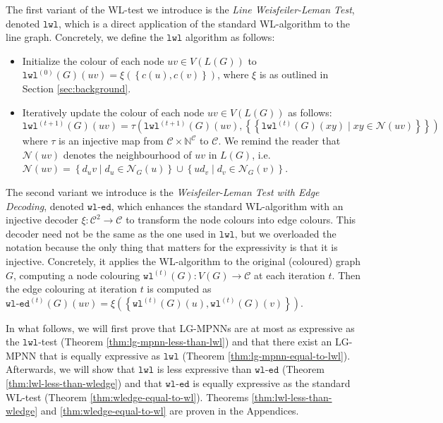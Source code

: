 \documentclass{article}
\newcommand{\set}[1]{\left\{#1\right\}}
\newcommand{\multiset}[1]{\left\{\!\!\left\{#1\right\}\!\!\right\}}
\newcommand{\iter}[1]{^{(#1)}}
\newcommand{\wl}{\texttt{wl}}
\newcommand{\wledge}{\texttt{wl-ed}}
\newcommand{\lwl}{\texttt{lwl}}
\newcommand{\dec}{\xi}
\newcommand{\hash}{\tau}
\newcommand{\nbh}{\mathcal{N}}
\newcommand{\mcc}{\mathcal{C}}
\newcommand{\mbn}{\mathbb{N}}
\begin{document}
The first variant of the WL-test we introduce is the \emph{Line Weisfeiler-Leman Test}, denoted $\lwl$, which is a direct application of the standard WL-algorithm to the line graph. Concretely, we define the $\lwl$ algorithm as follows:
\begin{itemize}
    \item Initialize the colour of each node $uv \in V(L(G))$ to $\lwl\iter{0}(G)(uv) = \dec(\set{c(u),c(v)})$, where $\dec$ is as outlined in Section \ref{sec:background}.
    \item Iteratively update the colour of each node $uv \in V(L(G))$ as follows:
    \begin{equation}
        \lwl\iter{t+1}(G)(uv) = \hash\left(\lwl\iter{t+1}(G)(uv), \multiset{\lwl\iter{t}(G)(xy) \mid xy \in \nbh(uv)}\right)
    \end{equation}
    where $\hash$ is an injective map from $\mcc\times\mbn^\mcc$ to $\mcc$. We remind the reader that $\nbh(uv)$ denotes the neighbourhood of $uv$ in $L(G)$, i.e. $\nbh(uv) = \set{d_uv \mid d_u \in \nbh_G(u)} \cup \set{ud_v \mid d_v \in \nbh_G(v)}$.
\end{itemize}
The second variant we introduce is the \emph{Weisfeiler-Leman Test with Edge Decoding}, denoted $\wledge$, which enhances the standard WL-algorithm with an injective decoder $\dec: \mcc^2\rightarrow\mcc$ to transform the node colours into edge colours. 
This decoder need not be the same as the one used in $\lwl$, but we overloaded the notation because the only thing that matters for the expressivity is that it is injective.
Concretely, it applies the WL-algorithm to the original (coloured) graph $G$, computing a node colouring $\wl\iter{t}(G): V(G) \rightarrow \mcc$ at each iteration $t$. Then the edge colouring at iteration $t$ is computed as $\wledge\iter{t}(G)(uv) = \dec(\set{\wl\iter{t}(G)(u),\wl\iter{t}(G)(v)})$.


In what follows, we will first prove that LG-MPNNs are at most as expressive as the $\lwl$-test (Theorem \ref{thm:lg-mpnn-less-than-lwl}) and that there exist an LG-MPNN that is equally expressive as $\lwl$ (Theorem \ref{thm:lg-mpnn-equal-to-lwl}).
Afterwards, we will show that $\lwl$ is less expressive than $\wledge$ (Theorem \ref{thm:lwl-less-than-wledge}) and that $\wledge$ is equally expressive as the standard WL-test (Theorem \ref{thm:wledge-equal-to-wl}). Theorems \ref{thm:lwl-less-than-wledge} and \ref{thm:wledge-equal-to-wl} are proven in the Appendices.
\end{document}
